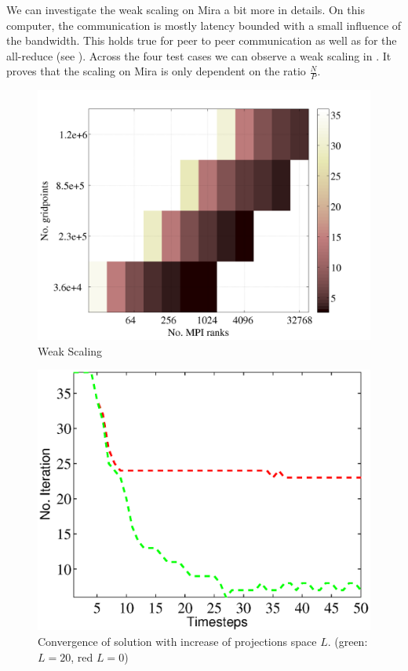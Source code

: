 \documentclass{sig-alternate}
\begin{document}
We can investigate the weak scaling on Mira a bit more in details. On this computer, the communication is mostly latency bounded with a small influence of the
bandwidth. This holds true for peer to peer communication as well as for the
all-reduce (see ). Across the four test cases we can observe a weak scaling in
. It proves that the scaling on Mira is only dependent
on the ratio $\frac{N}{P}$. 
\begin{figure}
  \centering
  \includegraphics[width=\linewidth]{./figures/weak.png}
  \caption{Weak Scaling}
  \label{fig:weakscaling}
\end{figure}

\begin{figure}
  \centering
  \includegraphics[width=\linewidth]{./figures/projections.eps}
  \caption{Convergence of solution with increase of projections space $L$. (green: $L=20$, red $L=0$) }
  \label{fig:projections}
\end{figure}
\end{document}
